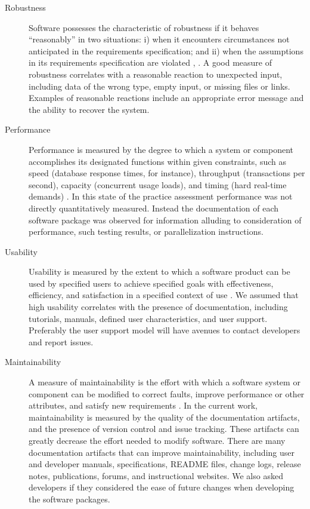\documentclass[final, 3p, times, authoryear]{elsarticle}
\begin{document}
\begin{description}
	\item[Robustness] Software possesses the characteristic of robustness if it
	behaves ``reasonably'' in two situations: i) when it encounters
	circumstances not anticipated in the requirements specification; and ii)
	when the assumptions in its requirements specification are violated
	\citep{boehm2007software}, \citep[p.\ 19]{GhezziEtAl2003}. A good measure of
	robustness correlates with a reasonable reaction to unexpected input,
	including data of the wrong type, empty input, or missing files or links.
	Examples of reasonable reactions include an appropriate error message and the
	ability to recover the system.
	
	\item[Performance] Performance is measured by the degree to which a system
	or component accomplishes its designated functions within given constraints,
	such as speed (database response times, for instance), throughput
	(transactions per second), capacity (concurrent usage loads), and timing
	(hard real-time demands) \citep{IEEEStdGlossarySET1990, wiegers2003softreq}.
	In this state of the practice assessment performance was not directly
	quantitatively measured. Instead the documentation of each software package
	was observed for information alluding to consideration of performance, such
	testing results, or parallelization instructions. 
	
	\item[Usability] Usability is measured by the extent to which a software
	product can be used by specified users to achieve specified goals with
	effectiveness, efficiency, and satisfaction in a specified context of use
	\citep{nielsonusability}. We assumed that high usability correlates with
	the presence of documentation, including tutorials, manuals, defined
	user characteristics, and user support. Preferably the user support model
	will have avenues to contact developers and report issues.
	
	\item[Maintainability] A measure of maintainability is the effort with which
	a software system or component can be modified to correct faults, improve
	performance or other attributes, and satisfy new requirements
	\citep{IEEEStdGlossarySET1990, boehm2007software}. In the current work,
	maintainability is measured by the quality of the documentation artifacts,
	and the presence of version control and issue tracking. These artifacts can
	greatly decrease the effort needed to modify software. There are many
	documentation artifacts that can improve maintainability, including user and
	developer manuals, specifications, README files, change logs, release notes,
	publications, forums, and instructional websites. We also asked developers
	if they considered the ease of future changes when developing the software
	packages.
	

\end{description}
\end{document}
